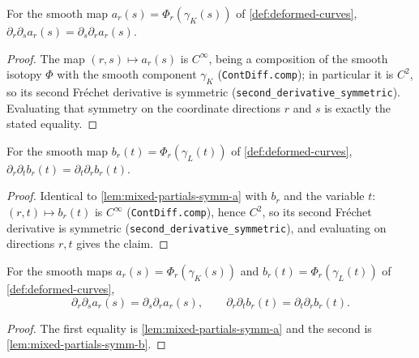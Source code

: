 \begin{lemma}
    \label{lem:mixed-partials-symm-a}
    For the smooth map $a_r(s)=\Phi_r(\gamma_K(s))$ of \cref{def:deformed-curves},
    $\partial_r\partial_s a_r(s)=\partial_s\partial_r a_r(s)$.
\end{lemma}
\begin{proof}
    The map $(r,s)\mapsto a_r(s)$ is $C^\infty$, being a composition of the smooth
    isotopy $\Phi$ with the smooth component $\gamma_K$ (\texttt{ContDiff.comp}); in
    particular it is $C^2$, so its second Fréchet derivative is symmetric
    (\texttt{second\_derivative\_symmetric}). Evaluating that symmetry on the
    coordinate directions $r$ and $s$ is exactly the stated equality.
\end{proof}

\begin{lemma}
    \label{lem:mixed-partials-symm-b}
    For the smooth map $b_r(t)=\Phi_r(\gamma_L(t))$ of \cref{def:deformed-curves},
    $\partial_r\partial_t b_r(t)=\partial_t\partial_r b_r(t)$.
\end{lemma}
\begin{proof}
    Identical to \cref{lem:mixed-partials-symm-a} with $b_r$ and the variable $t$:
    $(r,t)\mapsto b_r(t)$ is $C^\infty$ (\texttt{ContDiff.comp}), hence $C^2$, so its
    second Fréchet derivative is symmetric (\texttt{second\_derivative\_symmetric}),
    and evaluating on directions $r,t$ gives the claim.
\end{proof}

\begin{lemma}
    \label{lem:mixed-partials-symm}
    For the smooth maps $a_r(s)=\Phi_r(\gamma_K(s))$ and $b_r(t)=\Phi_r(\gamma_L(t))$
    of \cref{def:deformed-curves},
    \[
        \partial_r\partial_s a_r(s)=\partial_s\partial_r a_r(s),\qquad
        \partial_r\partial_t b_r(t)=\partial_t\partial_r b_r(t).
    \]
\end{lemma}
\begin{proof}
    The first equality is \cref{lem:mixed-partials-symm-a} and the second is
    \cref{lem:mixed-partials-symm-b}.
\end{proof}

